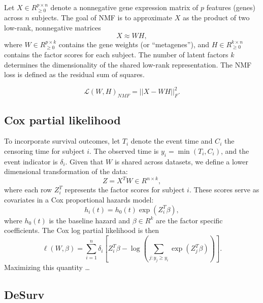 \documentclass[9pt,twocolumn,twoside,]{pnas-new}
\begin{document}
Let \(X \in R^{p \times n}_{\geq 0}\) denote a nonnegative gene
expression matrix of \(p\) features (genes) across \(n\) subjects. The
goal of NMF is to approximate \(X\) as the product of two low-rank,
nonnegative matrices \begin{equation}
X \approx WH,
\end{equation} where \(W \in R^{p \times k}_{\geq 0}\) contains the gene
weights (or ``metagenes''), and \(H \in R^{k \times n}_{\geq 0}\)
contains the factor scores for each subject. The number of latent
factors \(k\) determines the dimensionality of the shared low-rank
representation. The NMF loss is defined as the residual sum of squares.

\begin{equation}\label{nmf_loss}
    \mathcal{L}(W,H)_{NMF} = ||X - WH||^2_F.
\end{equation}

\subsection*{Cox partial likelihood}\label{cox-partial-likelihood}

To incorporate survival outcomes, let \(T_i\) denote the event time and
\(C_i\) the censoring time for subject \(i\). The observed time is
\(y_i = \min(T_i,C_i)\), and the event indicator is \(\delta_i\). Given
that \(W\) is shared across datasets, we define a lower dimensional
transformation of the data: \begin{equation}
Z=X^TW \in R^{n \times k},
\end{equation} where each row \(Z_i^T\) represents the factor scores for
subject \(i\). These scores serve as covariates in a Cox proportional
hazards model: \begin{equation}
h_i(t) = h_0(t)\exp(Z_i^T\beta),
\end{equation} where \(h_0(t)\) is the baseline hazard and
\(\beta \in R^k\) are the factor specific coefficients. The Cox log
partial likelihood is then \begin{equation}\label{loglik}
  \ell(W,\beta) = \sum_{i=1}^n \delta_i \left[Z_i^T\beta - \log\left(\sum_{j:y_j \geq y_i} \exp \left(Z_j^T\beta\right) \right)\right].
\end{equation} Maximizing this quantity \ldots{}

\subsection*{DeSurv}\label{desurv}
\end{document}
